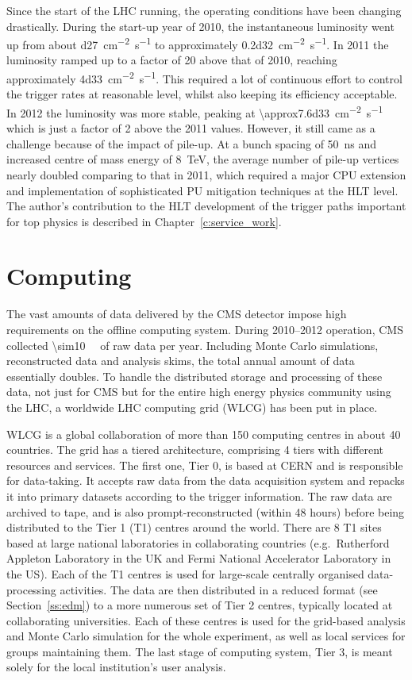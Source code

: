 Since the start of the LHC running, the operating conditions have been changing drastically. During the start-up year of
2010, the instantaneous luminosity went up from about \SI{d27}{\cm^{-2} s^{-1}} to approximately \SI{0.2d32}{\cm^{-2}
s^{-1}}. In 2011 the luminosity ramped up to a factor of \num{20} above that of 2010, reaching approximately
\SI{4d33}{\cm^{-2} s^{-1}}. This required a lot of continuous effort to control the trigger rates at reasonable level,
whilst also keeping its efficiency acceptable. In 2012 the luminosity was more stable, peaking at
\SI{\approx7.6d33}{\cm^{-2} s^{-1}} which is just a factor of 2 above the 2011 values. However, it still came as a
challenge because of the impact of pile-up. At a bunch spacing of \SI{50}{\ns} and increased centre of mass energy of
\SI{8}{\TeV}, the average number of pile-up vertices nearly doubled comparing to that in 2011, which required a major
CPU extension and implementation of sophisticated PU mitigation techniques at the HLT level. The author's contribution
to the HLT development of the trigger paths important for top physics is described in Chapter~\ref{c:service_work}.

\section{Computing}
\label{s:computing}
The vast amounts of data delivered by the CMS detector impose high requirements on the offline computing system. During
2010--2012 operation, CMS collected \SI{\sim10}{\peta\byte} of raw data per year. Including Monte Carlo simulations,
reconstructed data and analysis skims, the total annual amount of data essentially doubles. To handle the distributed
storage and processing of these data, not just for CMS but for the entire high energy physics community using the LHC, a
worldwide LHC computing grid (WLCG) has been put in place.

WLCG is a global collaboration of more than 150 computing centres in about 40 countries. The grid has a tiered
architecture, comprising 4 tiers with different resources and services. The first one, Tier 0, is based at CERN and is
responsible for data-taking. It accepts raw data from the data acquisition system and repacks it into primary datasets
according to the trigger information. The raw data are archived to tape, and is also prompt-reconstructed (within 48
hours) before being distributed to the Tier 1 (T1) centres around the world. There are 8 T1 sites based at large
national laboratories in collaborating countries (e.g.\ Rutherford Appleton Laboratory in the UK and Fermi National
Accelerator Laboratory in the US). Each of the T1 centres is used for large-scale centrally organised data-processing
activities. The data are then distributed in a reduced format (see Section~\ref{ss:edm}) to a more numerous set of Tier
2 centres, typically located at collaborating universities. Each of these centres is used for the grid-based analysis
and Monte Carlo simulation for the whole experiment, as well as local services for groups maintaining them. The last
stage of computing system, Tier 3, is meant solely for the local institution's user analysis.

